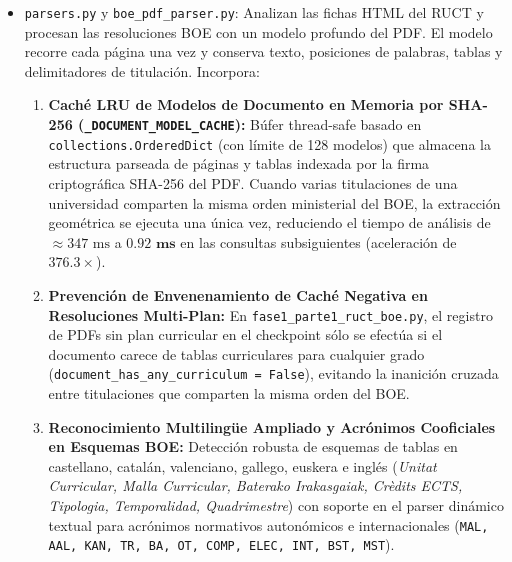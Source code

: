 \begin{itemize}
\begin{enumerate}
        \item \textbf{Gestión Robusta de Reintentos y Retroceso Exponencial:} Manejo blindado de respuestas HTTP 429 (\emph{Too Many Requests}) con pausas de retroceso exponencial aplicadas sobre el bucle externo de intentos, y reinicio limpio de la variable de respuesta por iteración para evitar registrar datos desactualizados en el ledger de auditoría.
        \item \textbf{Normalización de Enlaces y Verificación de Cabeceras:} Verifica la cabecera mágica \texttt{\%PDF-} en streaming para descartar respuestas HTML erróneas de servidores oficiales, desinfecta esquemas duplicados (\texttt{http://https://}), eleva automáticamente a \texttt{HTTPS} los enlaces de boletines autonómicos y corrige erratas tipográficas del ministerio mediante \texttt{DOMAIN\_MAPPINGS}.
    \end{enumerate}
    \item \texttt{parsers.py} y \texttt{boe\_pdf\_parser.py}: Analizan las fichas HTML del RUCT y procesan las resoluciones BOE con un modelo profundo del PDF. El modelo recorre cada página una vez y conserva texto, posiciones de palabras, tablas y delimitadores de titulación. Incorpora:
    \begin{enumerate}
        \item \textbf{Caché LRU de Modelos de Documento en Memoria por SHA-256 (\texttt{\_DOCUMENT\_MODEL\_CACHE}):} Búfer thread-safe basado en \texttt{collections.OrderedDict} (con límite de 128 modelos) que almacena la estructura parseada de páginas y tablas indexada por la firma criptográfica SHA-256 del PDF. Cuando varias titulaciones de una universidad comparten la misma orden ministerial del BOE, la extracción geométrica se ejecuta una única vez, reduciendo el tiempo de análisis de $\approx 347\text{ ms}$ a $\mathbf{0.92\text{ ms}}$ en las consultas subsiguientes (aceleración de $\mathbf{376.3\times}$).
        \item \textbf{Prevención de Envenenamiento de Caché Negativa en Resoluciones Multi-Plan:} En \texttt{fase1\_parte1\_ruct\_boe.py}, el registro de PDFs sin plan curricular en el checkpoint sólo se efectúa si el documento carece de tablas curriculares para cualquier grado (\texttt{document\_has\_any\_curriculum = False}), evitando la inanición cruzada entre titulaciones que comparten la misma orden del BOE.
        \item \textbf{Reconocimiento Multilingüe Ampliado y Acrónimos Cooficiales en Esquemas BOE:} Detección robusta de esquemas de tablas en castellano, catalán, valenciano, gallego, euskera e inglés (\emph{Unitat Curricular, Malla Curricular, Baterako Irakasgaiak, Crèdits ECTS, Tipologia, Temporalidad, Quadrimestre}) con soporte en el parser dinámico textual para acrónimos normativos autonómicos e internacionales (\texttt{MAL, AAL, KAN, TR, BA, OT, COMP, ELEC, INT, BST, MST}).

\end{enumerate}
\end{itemize}
